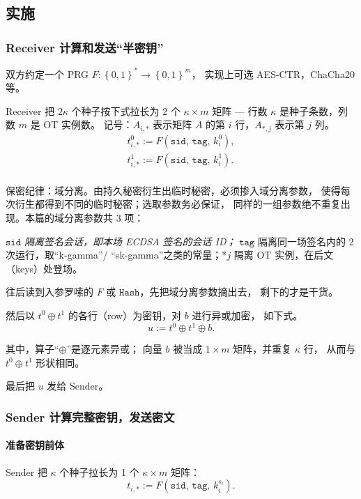 \subsection{实施}
\subsubsection{Receiver 计算和发送“半密钥”}

双方约定一个
PRG $F: \left\{0,1\right\}^* \rightarrow \left\{0,1\right\}^m$，
实现上可选 AES-CTR，ChaCha20 等。

Receiver 把 $2\kappa$ 个种子按下式拉长为 2 个 $\kappa\times m$ 矩阵 ---
行数 $\kappa$ 是种子条数，列数 $m$ 是 OT 实例数。
记号：$A_{i,*}$ 表示矩阵 $A$ 的第 $i$ 行，$A_{*,j}$ 表示第 $j$ 列。
\begin{align}t^0_{i,*}:=F\left(\mathtt{sid},\,\mathtt{tag},\, k^0_i\right), \\
t^1_{i,*}:=F\left(\mathtt{sid},\,\mathtt{tag},\, k^1_i\right). \\
\end{align}

保密纪律：域分离。由持久秘密衍生出临时秘密，必须掺入域分离参数，
使得每次衍生都得到不同的临时秘密；选取参数务必保证，
同样的一组参数绝不重复出现。本篇的域分离参数共 3 项：

\emph{$\mathtt{sid}$ 隔离签名会话，即本场 ECDSA 签名的会话 ID；
}$\mathtt{tag}$ 隔离同一场签名内的 2 次运行，取“k-gamma”/
“sk-gamma”之类的常量；*$j$ 隔离 OT 实例，在后文（keys）处登场。

往后读到入参罗嗦的 $F$ 或 $\mathtt{Hash}$，先把域分离参数摘出去，
剩下的才是干货。

然后以 $t^0 \oplus t^1$ 的各行（row）为密钥，对 $b$ 进行异或加密，
如下式。
\begin{equation}\label{eq:01-iknp03:umat}
{u}:={t}^0 \oplus {t}^1 \oplus b. \tag{umat}
\end{equation}

其中，算子“$\oplus$”是逐元素异或；
向量 $b$ 被当成 $1\times m$ 矩阵，并重复 $\kappa$ 行，
从而与 $t^0 \oplus t^1$ 形状相同。

最后把 $u$ 发给 Sender。

\subsubsection{Sender 计算完整密钥，发送密文}

\paragraph{准备密钥前体}Sender 把 $\kappa$ 个种子拉长为 1 个 $\kappa\times m$ 矩阵：
\begin{equation}\label{eq:01-iknp03:2}
t_{i,*} := F\left(\mathtt{sid},\,\mathtt{tag},\,k^{s_i}_i\right).
\end{equation}

